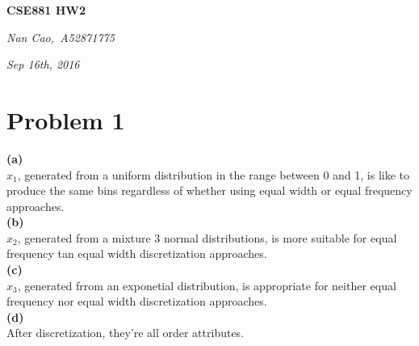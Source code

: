 \documentclass[11pt]{scrartcl}
\begin{document}
\centerline{\LARGE{\textbf{CSE881 HW2}}}
\centerline{\large{\textit{Nan Cao,\  A52871775}}}
\centerline{\large{\textit{Sep 16th, 2016}}}
\section*{Problem 1}
\textbf{(a)}\\
$x_1$,  generated from a uniform distribution in the range between 0 and 1, is like to produce the same bins regardless of whether using equal width or equal frequency approaches.\\
\textbf{(b)}\\
$x_2$, generated from a mixture 3 normal distributions, is more suitable for equal frequency tan equal width discretization approaches.\\
\textbf{(c)}\\
$x_3$, generated frrom an exponetial distribution, is appropriate for neither equal frequency nor equal width discretization approaches.\\
\textbf{(d)}\\
After discretization, they're all order attributes.
\end{document}
